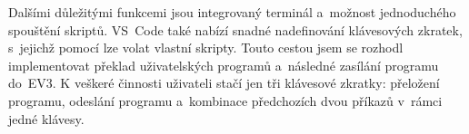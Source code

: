 Dalšími důležitými funkcemi jsou integrovaný terminál a~možnost jednoduchého spouštění skriptů.
VS~Code také nabízí snadné nadefinování klávesových zkratek, s~jejichž pomocí lze volat vlastní skripty.
Touto cestou jsem se rozhodl implementovat překlad uživatelských programů a~následné zasílání programu do~EV3.
K veškeré činnosti uživateli stačí jen tři klávesové zkratky: přeložení programu, odeslání programu a~kombinace předchozích dvou příkazů v~rámci jedné klávesy. 
